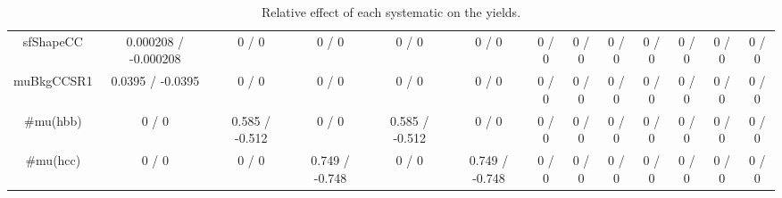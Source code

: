 \documentclass[10pt]{article}
\begin{document}
\begin{table}[htbp]
\begin{center}
\begin{tabular}{|c|c|c|c|c|c|c|c|c|c|c|c|c|}
  sfShapeCC & 0.000208 / -0.000208 & 0 / 0 & 0 / 0 & 0 / 0 & 0 / 0 & 0 / 0 & 0 / 0 & 0 / 0 & 0 / 0 & 0 / 0 & 0 / 0 & 0 / 0 \\ 
  muBkgCCSR1 & 0.0395 / -0.0395 & 0 / 0 & 0 / 0 & 0 / 0 & 0 / 0 & 0 / 0 & 0 / 0 & 0 / 0 & 0 / 0 & 0 / 0 & 0 / 0 & 0 / 0 \\ 
  #mu(hbb) & 0 / 0 & 0.585 / -0.512 & 0 / 0 & 0.585 / -0.512 & 0 / 0 & 0 / 0 & 0 / 0 & 0 / 0 & 0 / 0 & 0 / 0 & 0 / 0 & 0 / 0 \\ 
  #mu(hcc) & 0 / 0 & 0 / 0 & 0.749 / -0.748 & 0 / 0 & 0.749 / -0.748 & 0 / 0 & 0 / 0 & 0 / 0 & 0 / 0 & 0 / 0 & 0 / 0 & 0 / 0 \\ 
\hline 
\end{tabular} 
\caption{Relative effect of each systematic on the yields.} 
\end{center} 
\end{table} 
\end{document}
